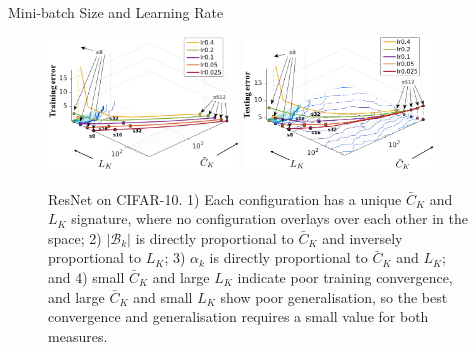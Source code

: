 \documentclass{beamer}
\begin{document}
\begin{frame}{Mini-batch Size and Learning Rate}
    \begin{figure}
        \centering
        \includegraphics[width=0.45\textwidth]{figs/fig_batchsize_cifar10_train.png}
        \includegraphics[width=0.45\textwidth]{figs/fig_batchsize_cifar10_test.png}
        \caption{ResNet on CIFAR-10. 1) Each configuration has a unique $\bar{C}_K$ and $L_K$ signature, where no configuration overlays over each other in the space;
        2) $|\mathcal{B}_k|$ is directly proportional to $\bar{C}_K$ and inversely proportional to $L_K$;
        3) $\alpha_k$ is directly proportional to $\bar{C}_K$ and $L_K$; and
        4) small $\bar{C}_K$ and large $L_K$ indicate poor training convergence, and large $\bar{C}_K$ and small $L_K$ show poor generalisation, so the best convergence and generalisation requires a small value for both measures.}
        \label{fig:batch-lr}
    \end{figure}
\end{frame}
\end{document}
